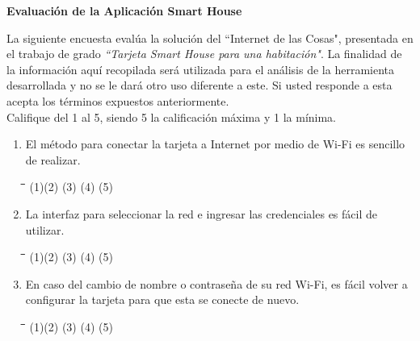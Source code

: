 \begin{appendix}
\textbf{Evaluación de la Aplicación Smart House\\}

La siguiente encuesta evalúa la solución del ``Internet de las Cosas", presentada en el trabajo de grado \textit{``Tarjeta Smart House para una habitación"}. La finalidad de la información aquí recopilada será utilizada para el análisis de la herramienta desarrollada y no se le dará otro uso diferente a este. Si usted responde a esta acepta los términos expuestos anteriormente.\\

Califique del 1 al 5, siendo 5 la calificación máxima y 1 la mínima.\\

\begin{enumerate}
	\item El método para conectar la tarjeta a Internet por medio de Wi-Fi es sencillo de realizar.
		
\begin{tabbing}
	\hspace{2cm}\=\hspace{2cm}\=\hspace{2cm}\=\hspace{2cm}\=\kill
	(1)\>(2)  \>(3)  \>(4)  \>(5) 
\end{tabbing} 
		
	\item La interfaz para seleccionar la red e ingresar las credenciales es fácil de utilizar. 
	
	\begin{tabbing}
		\hspace{2cm}\=\hspace{2cm}\=\hspace{2cm}\=\hspace{2cm}\=\kill
		(1)\>(2)  \>(3)  \>(4)  \>(5) 
	\end{tabbing} 

	\item En caso del cambio de nombre o contraseña de su red Wi-Fi, es fácil volver a configurar la tarjeta para que esta se conecte de nuevo.
	
	\begin{tabbing}
		\hspace{2cm}\=\hspace{2cm}\=\hspace{2cm}\=\hspace{2cm}\=\kill
		(1)\>(2)  \>(3)  \>(4)  \>(5) 
	\end{tabbing} 


\end{enumerate}
\end{appendix}
